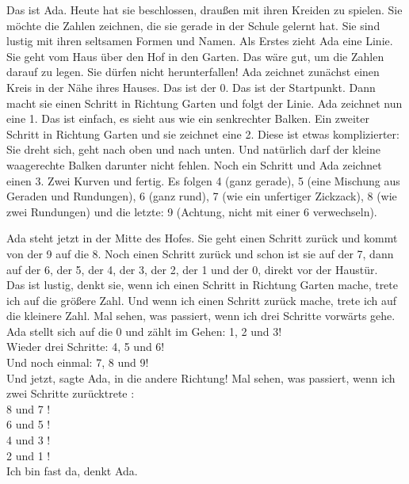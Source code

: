 Das ist Ada. Heute hat sie beschlossen, draußen mit ihren Kreiden zu spielen. 
Sie möchte die Zahlen zeichnen, die sie gerade in der Schule gelernt hat. Sie sind lustig mit ihren seltsamen Formen und Namen.
Als Erstes zieht Ada eine Linie. Sie geht vom Haus über den Hof in den Garten.
Das wäre gut, um die Zahlen darauf zu legen. Sie dürfen nicht herunterfallen! 
Ada zeichnet zunächst einen Kreis in der Nähe ihres Hauses. Das ist der 0. Das ist der Startpunkt. 
Dann macht sie einen Schritt in Richtung Garten und folgt der Linie. Ada zeichnet nun eine 1. Das ist einfach, es sieht aus wie ein senkrechter Balken. 
Ein zweiter Schritt in Richtung Garten und sie zeichnet eine 2. Diese ist etwas komplizierter: Sie dreht sich, geht nach oben und nach unten. Und natürlich darf der kleine waagerechte Balken darunter nicht fehlen.
Noch ein Schritt und Ada zeichnet einen 3. Zwei Kurven und fertig.
Es folgen 4 (ganz gerade), 5 (eine Mischung aus Geraden und Rundungen), 6 (ganz rund), 7 (wie ein unfertiger Zickzack), 8 (wie zwei Rundungen) und die letzte: 9 (Achtung, nicht mit einer 6 verwechseln). 

Ada steht jetzt in der Mitte des Hofes. Sie geht einen Schritt zurück und kommt von der 9 auf die 8. Noch einen Schritt zurück und schon ist sie auf der 7, dann auf der 6, der 5, der 4, der 3, der 2, der 1 und der 0, direkt vor der Haustür.\\ 
\frqq{}Das ist lustig\flqq{}, denkt sie, \frqq{}wenn ich einen Schritt in Richtung Garten mache, trete ich auf die größere Zahl. Und wenn ich einen Schritt zurück mache, trete ich auf die kleinere Zahl. 
Mal sehen, was passiert, wenn ich drei Schritte vorwärts gehe.\flqq{}\\
Ada stellt sich auf die 0 und zählt im Gehen: \frqq{}1, 2 und 3!\flqq{}\\
Wieder drei Schritte: \frqq{}4, 5 und 6!\flqq{}\\
Und noch einmal: \frqq{}7, 8 und 9!\flqq{}\\
\frqq{}Und jetzt\flqq{}, sagte Ada, \frqq{}in die andere Richtung!\flqq{} Mal sehen, was passiert, wenn ich zwei Schritte zurücktrete : \\
\frqq{}8 und 7 !\flqq{}\\ 
\frqq{}6 und 5 !\flqq{}\\ 
\frqq{}4 und 3 !\flqq{}\\ 
\frqq{}2 und 1 !\flqq{}\\
\frqq{}Ich bin fast da\flqq{}, denkt Ada.
